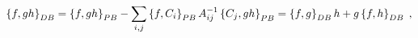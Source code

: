 \begin{equation}
\left\{  f,gh\right\}  _{{\footnotesize DB}}=\left\{  f,gh\right\}
_{{\footnotesize PB}}-\sum_{i,j}\left\{  f,C_{i}\right\}  _{{\footnotesize PB}%
}A_{ij}^{-1}\left\{  C_{j},gh\right\}  _{{\footnotesize PB}}=\left\{
f,g\right\}  _{{\footnotesize DB}}h+g\left\{  f,h\right\}
_{{\footnotesize DB}}\;,
\end{equation}

